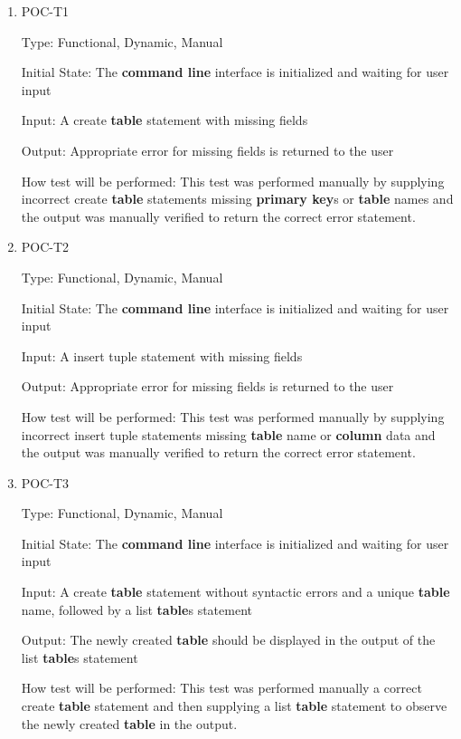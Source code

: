 \documentclass[12pt, titlepage]{article}
\begin{document}
\begin{enumerate}

\item{POC-T1\\}

Type: Functional, Dynamic, Manual
					
Initial State: The \textbf{command line} interface is initialized and waiting for user input
					
Input: A create \textbf{table} statement with missing fields
					
Output: Appropriate error for missing fields is returned to the user
					
How test will be performed: This test was performed manually by supplying incorrect create \textbf{table} statements missing \textbf{primary key}s or \textbf{table} names and the output was manually verified to return the correct error statement.
					
\item{POC-T2\\}

Type: Functional, Dynamic, Manual
					
Initial State: The \textbf{command line} interface is initialized and waiting for user input
					
Input: A insert tuple statement with missing fields
					
Output: Appropriate error for missing fields is returned to the user
					
How test will be performed: This test was performed manually by supplying incorrect insert tuple statements missing \textbf{table} name or \textbf{column} data and the output was manually verified to return the correct error statement. 

\item{POC-T3\\}

Type: Functional, Dynamic, Manual
					
Initial State: The \textbf{command line} interface is initialized and waiting for user input
					
Input: A create \textbf{table} statement without syntactic errors and a unique \textbf{table} name, followed by a list \textbf{table}s statement
					
Output: The newly created \textbf{table} should be displayed in the output of the list \textbf{table}s statement
					
How test will be performed: This test was performed manually a correct create \textbf{table} statement and then supplying a list \textbf{table} statement to observe the newly created \textbf{table} in the output.


\end{enumerate}
\end{document}

